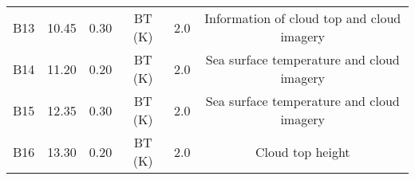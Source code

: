\begin{table}[h]
{\begin{tabular}{cccccc}
            B13               & 10.45                   & 0.30           & BT (K)      & 2.0             & Information of cloud top and cloud imagery \\
            B14               & 11.20                   & 0.20           & BT (K)      & 2.0             & Sea surface temperature and cloud imagery  \\
            B15               & 12.35                   & 0.30           & BT (K)      & 2.0             & Sea surface temperature and cloud imagery  \\
            B16               & 13.30                   & 0.20           & BT (K)      & 2.0             & Cloud top height                           \\ \hline
        \end{tabular}
    }
    \label{table:AHI_info}
\end{table}


